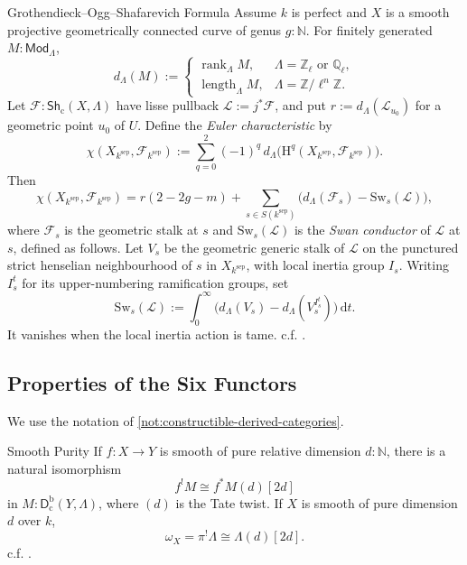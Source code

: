 \documentclass[11pt,letterpaper]{article}
\theoremstyle{numberfirstplain}
\numberwithin{equation}{theorem}
\theoremstyle{numberfirstupright}
\begin{document}
\begin{custom}{Grothendieck–Ogg–Shafarevich Formula}\label{thm:grothendieck-ogg-shafarevich}
Assume $k$ is perfect and $X$ is a smooth projective geometrically connected curve of genus $g:\mathbb N$.
For finitely generated $M:\mathsf{Mod}_{\Lambda}$, 
\[
d_\Lambda(M):=
\begin{cases}
\operatorname{rank}_\Lambda M,
&\Lambda=\mathbb Z_\ell\text{ or }\mathbb Q_\ell,\\[2pt]
\operatorname{length}_\Lambda M,
&\Lambda=\mathbb Z/\ell^n\mathbb Z.
\end{cases}
\]
Let $\mathcal F:\mathsf{Sh}_{\mathrm c}(X,\Lambda)$ have lisse pullback $\mathcal L:=j^*\mathcal F$, and put $r:=d_\Lambda(\mathcal L_{u_0})$ for a geometric point $u_0$ of $U$.
Define the \textit{Euler characteristic} by
\[
\chi(X_{k^{\mathrm{sep}}},\mathcal F_{k^{\mathrm{sep}}})
:=\sum_{q=0}^{2}(-1)^q\,
d_\Lambda\bigl(\mathrm H^q(X_{k^{\mathrm{sep}}},\mathcal F_{k^{\mathrm{sep}}})\bigr).
\]
Then
\[
\chi(X_{k^{\mathrm{sep}}},\mathcal F_{k^{\mathrm{sep}}})
=r(2-2g-m)
+\sum_{s\in S(k^{\mathrm{sep}})}
\bigl(d_\Lambda(\mathcal F_s)-\mathrm{Sw}_s(\mathcal L)\bigr),
\]
where $\mathcal F_s$ is the geometric stalk at $s$ and $\mathrm{Sw}_s(\mathcal L)$ is the \textit{Swan conductor} of $\mathcal L$ at $s$, defined as follows. 
Let $V_s$ be the geometric generic stalk of $\mathcal L$ on the punctured strict henselian neighbourhood of $s$ in $X_{k^{\mathrm{sep}}}$, with local inertia group $I_s$.
Writing $I_s^t$ for its upper-numbering ramification groups, set
\[
\mathrm{Sw}_s(\mathcal L):=
\int_0^\infty
\bigl(d_\Lambda(V_s)-d_\Lambda(V_s^{I_s^t})\bigr)\,\mathrm d t.
\]
It vanishes when the local inertia action is tame. 
c.f. \cite[Exp.~X, \S7]{SGA5}.
\end{custom}


\subsection{Properties of the Six Functors}\label{app:six-functor-properties}

We use the notation of \cref{not:constructible-derived-categories}.

\begin{custom}{Smooth Purity}\label{thm:smooth-purity}
If $f:X\to Y$ is smooth of pure relative dimension $d:\mathbb N$, there is a natural isomorphism \cite[Exp.~XVIII, Theorem~3.2.5]{SGA4III}
\[
f^!M\cong f^*M(d)[2d]
\]
in $M:\mathsf D_{\mathrm c}^{\mathrm b}(Y,\Lambda)$, where $(d)$ is the Tate twist. %
If $X$ is smooth of pure dimension $d$ over $k$, 
\[
\omega_X=\pi^!\Lambda\cong\Lambda(d)[2d].
\]
c.f. \cite[\S2.1.2(6) and \S2.2.1]{Katz1996}.
\end{custom}
\end{document}
